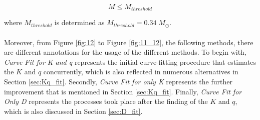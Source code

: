 \documentclass[letterpaper,12pt]{article}
\begin{document}
\begin{equation*}
    M \leq M_{threshold}
\end{equation*}

where $M_{threshold}$ is determined as $M_{threshold} = 0.34 \; M_\odot$.

\paragraph{} Moreover, from Figure \ref{fig:12} to Figure \ref{fig:11_12}, the following methods, there are different annotations for the usage of the different methods. To begin with, \textit{Curve Fit for K and q} represents the initial curve-fitting procedure that estimates the $K$ and $q$ concurrently, which is also reflected in numerous alternatives in Section \ref{sec:Kq_fit}. Secondly, \textit{Curve Fit for only K} represents the further improvement that is mentioned in Section \ref{sec:Kq_fit}. Finally, \textit{Curve Fit for Only D} represents the processes took place after the finding of the $K$ and $q$, which is also discussed in Section \ref{sec:D_fit}.
\end{document}

